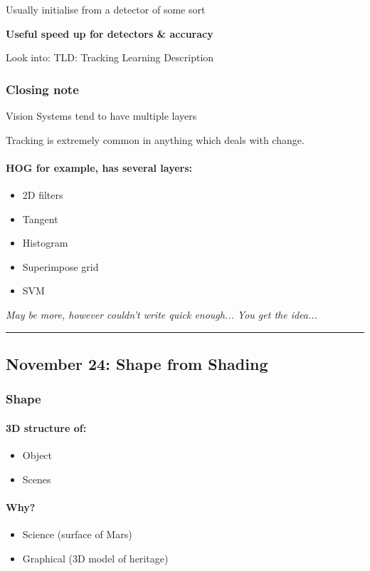 \documentclass[paper=a4, fontsize=11pt]{article} %
\numberwithin{equation}{section} %
\numberwithin{figure}{section} %
\numberwithin{table}{section} %
\begin{document}
Usually initialise from a detector of some sort

\textbf{Useful speed up for detectors \& accuracy}

Look into: TLD: Tracking Learning Description

\subsubsection{Closing note}

Vision Systems tend to have multiple layers

Tracking is extremely common in anything which deals with change.

\paragraph{HOG for example, has several layers:}
\begin{itemize}
\item 2D filters
\item Tangent
\item Histogram
\item Superimpose grid
\item SVM
\end{itemize}
\textit{May be more, however couldn't write quick enough... You get the idea...}




\rule{\textwidth}{1pt}

\subsection{November 24: Shape from Shading}

\subsubsection{Shape}

\paragraph{3D structure of: }
\begin{itemize}
\item Object
\item Scenes
\end{itemize}

\paragraph{Why?}
\begin{itemize}
\item Science (surface of Mars)
\item Graphical (3D model of heritage)
\end{itemize}
\end{document}
